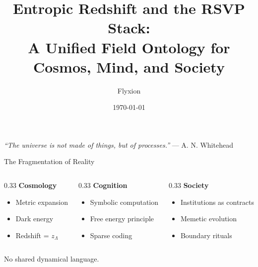 \documentclass{beamer}
\title{\Large\textbf{Entropic Redshift and the RSVP Stack:\\A Unified Field Ontology for Cosmos, Mind, and Society}}
\author{Flyxion}
\institute{Independent Researcher}
\date{\today}
\begin{document}
\begin{frame}
\titlepage
\begin{center}
\vspace{1em}
\textit{“The universe is not made of things, but of processes.”} — A. N. Whitehead
\end{center}
\end{frame}

\begin{frame}{The Fragmentation of Reality}
\begin{columns}
\begin{column}{0.33\textwidth}
\textbf{Cosmology}\\[0.5em]
\begin{itemize}
\item Metric expansion
\item Dark energy
\item Redshift = $z_\Lambda$
\end{itemize}
\end{column}
\begin{column}{0.33\textwidth}
\textbf{Cognition}\\[0.5em]
\begin{itemize}
\item Symbolic computation
\item Free energy principle
\item Sparse coding
\end{itemize}
\end{column}
\begin{column}{0.33\textwidth}
\textbf{Society}\\[0.5em]
\begin{itemize}
\item Institutions as contracts
\item Memetic evolution
\item Boundary rituals
\end{itemize}
\end{column}
\end{columns}
\vspace{1em}
\centering
\alert{No shared dynamical language.}
\end{frame}
\end{document}
